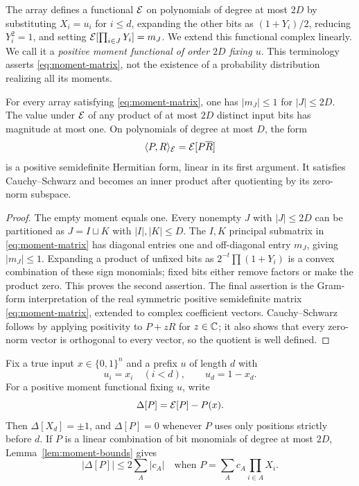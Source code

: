 The array defines a functional $\mathcal E$ on polynomials of degree at most
$2D$ by substituting $X_i=u_i$ for
$i\le d$, expanding the other bits as $(1+Y_i)/2$, reducing $Y_i^2=1$,
and setting $\mathcal E[\prod_{i\in J}Y_i]=m_J$. We extend this functional
complex linearly. We call it a \emph{positive moment functional of order
$2D$ fixing $u$}. This terminology asserts \eqref{eq:moment-matrix},
not the existence of a probability distribution realizing all its moments.

\begin{lemma}\label{lem:moment-bounds}
For every array satisfying \eqref{eq:moment-matrix}, one has
$|m_J|\le1$ for $|J|\le2D$. The value under $\mathcal E$ of any product of at
most $2D$ distinct input bits has magnitude at most one. On polynomials
of degree at most $D$, the form
\[
 \langle P,R\rangle_{\mathcal E}=\mathcal E[P\overline R]
\]
is a positive semidefinite Hermitian form, linear in its first argument.
It satisfies Cauchy--Schwarz and becomes an inner product after
quotienting by its zero-norm subspace.
\end{lemma}

\begin{proof}
The empty moment equals one. Every nonempty $J$ with $|J|\le2D$ can be partitioned as $J=I\sqcup K$ with
$|I|,|K|\le D$. The $I,K$ principal submatrix in
\eqref{eq:moment-matrix} has diagonal entries one and off-diagonal
entry $m_J$, giving $|m_J|\le1$. Expanding a product of unfixed bits
as $2^{-t}\prod(1+Y_i)$ is a convex combination of these sign monomials;
fixed bits either remove factors or make the product zero. This proves
the second assertion. The final assertion is the Gram-form
interpretation of the real symmetric positive semidefinite matrix
\eqref{eq:moment-matrix}, extended to complex coefficient vectors.
Cauchy--Schwarz follows by applying positivity to $P+zR$ for $z\in\mathbb C$;
it also shows that every zero-norm vector is orthogonal to every vector,
so the quotient is well defined.
\end{proof}

Fix a true input $x\in\{0,1\}^n$ and a prefix $u$ of length $d$ with
\[
 u_i=x_i\quad(i<d),\qquad u_d=1-x_d.
\]
For a positive moment functional fixing $u$, write
\[
 \Delta[P]=\mathcal E[P]-P(x).
\]
Then $\Delta[X_d]=\pm1$, and $\Delta[P]=0$ whenever $P$ uses only
positions strictly before $d$. If $P$ is a linear combination of bit
monomials of degree at most $2D$, Lemma~\ref{lem:moment-bounds} gives
\begin{equation}\label{eq:delta-coefficients}
 |\Delta[P]|\le2\sum_A |c_A|
 \quad\text{when }P=\sum_A c_A\prod_{i\in A}X_i.
\end{equation}

